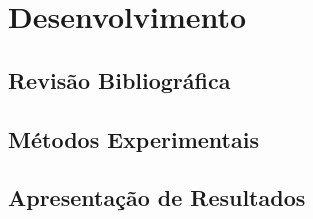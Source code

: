 \chapter{Desenvolvimento}

\section{Revisão Bibliográfica}

\section{Métodos Experimentais}

\section{Apresentação de Resultados}